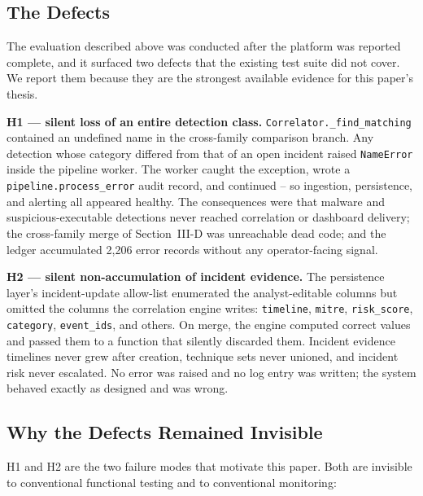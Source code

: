 \documentclass[conference]{IEEEtran}
\begin{document}
\subsection{The Defects}

The evaluation described above was conducted after the platform was reported
complete, and it surfaced two defects that the existing test suite did not
cover. We report them because they are the strongest available evidence for
this paper's thesis.

\textbf{H1 --- silent loss of an entire detection class.}
\texttt{Correlator.\_find\_matching} contained an undefined name in the
cross-family comparison branch. Any detection whose category differed from
that of an open incident raised \texttt{NameError} inside the pipeline worker.
The worker caught the exception, wrote a \texttt{pipeline.process\_error}
audit record, and continued -- so ingestion, persistence, and alerting all
appeared healthy. The consequences were that malware and
suspicious-executable detections never reached correlation or dashboard
delivery; the cross-family merge of Section~III-D was unreachable dead code;
and the ledger accumulated 2{,}206 error records without any operator-facing
signal.

\textbf{H2 --- silent non-accumulation of incident evidence.}
The persistence layer's incident-update allow-list enumerated the
analyst-editable columns but omitted the columns the correlation engine
writes: \texttt{timeline}, \texttt{mitre}, \texttt{risk\_score},
\texttt{category}, \texttt{event\_ids}, and others. On merge, the engine
computed correct values and passed them to a function that silently discarded
them. Incident evidence timelines never grew after creation, technique sets
never unioned, and incident risk never escalated. No error was raised and no
log entry was written; the system behaved exactly as designed and was wrong.

\subsection{Why the Defects Remained Invisible}

H1 and H2 are the two failure modes that motivate this paper. Both are
invisible to conventional functional testing and to conventional monitoring:
\end{document}
